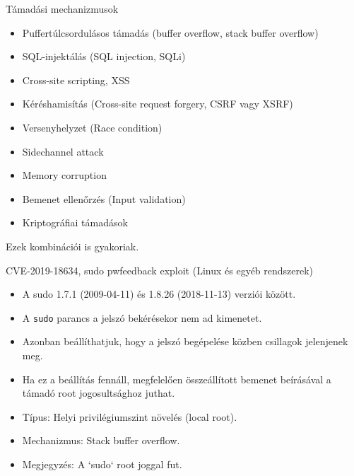 \documentclass[12 pt]{beamer}
\begin{document}
\begin{frame}{Támadási mechanizmusok}
  \begin{itemize}
    \item{Puffertúlcsordulásos támadás (buffer overflow, stack buffer overflow)}
    \item{SQL-injektálás (SQL injection, SQLi)}
    \item{Cross-site scripting, XSS}
    \item{Kéréshamisítás (Cross-site request forgery, CSRF vagy XSRF)}
    \item{Versenyhelyzet (Race condition)}
    \item{Sidechannel attack}
    \item{Memory corruption}
    \item{Bemenet ellenőrzés (Input validation)}
    \item{Kriptográfiai támadások}
  \end{itemize}

  \qquad

  Ezek kombinációi is gyakoriak.
\end{frame}

\begin{frame}{CVE-2019-18634, sudo pwfeedback exploit (Linux és egyéb rendszerek)}
  \begin{itemize}
    \item{A sudo 1.7.1 (2009-04-11) és 1.8.26 (2018-11-13) verziói között.}
    \item{A \texttt{sudo} parancs a jelszó bekérésekor nem ad kimenetet.}
    \item{Azonban beállíthatjuk, hogy a jelszó begépelése közben csillagok jelenjenek meg.}
    \item{Ha ez a beállítás fennáll, megfelelően összeállított bemenet beírásával a támadó root jogosultsághoz juthat.}
    \item{Típus: Helyi privilégiumszint növelés (local root).}
    \item{Mechanizmus: Stack buffer overflow.}
    \item{Megjegyzés: A `sudo` root joggal fut.}
  \end{itemize}
\end{frame}

\end{document}
